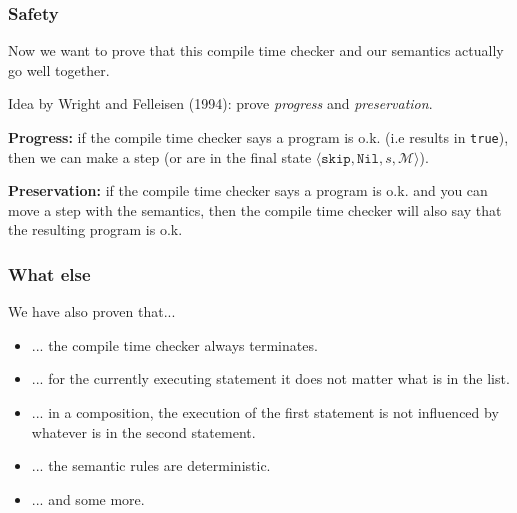\documentclass{beamer}
\newcommand{\sk}[0]{\texttt{skip}}
\newcommand{\nil}[0]{\texttt{Nil}}
\newcommand{\tr}[0]{\texttt{true}}
\newcommand{\sosb}[4]{\langle #1, #2, #3, \mathcal{#4} \rangle}
\begin{document}
\begin{frame}
\frametitle{Safety}
Now we want to prove that this compile time checker and our semantics actually go well together.

Idea by Wright and Felleisen (1994): prove \emph{progress} and \emph{preservation}.

\vspace{0.7cm}
\textbf{Progress:} if the compile time checker says a program is o.k. (i.e results in \tr), then we can make a step (or are in the final state $\sosb{\sk}{\nil}{s}{M}$).

\vspace{0.2cm}
\textbf{Preservation:} if the compile time checker says a program is o.k. and you can move a step with the semantics, then the compile time checker will also say that the resulting program is o.k.
\end{frame}


\begin{frame}
\frametitle{What else}
We have also proven that...
\begin{itemize}
    \item ... the compile time checker always terminates.
    \item ... for the currently executing statement it does not matter what is in the list.
    \item ... in a composition, the execution of the first statement is not influenced by whatever is in the second statement.
    \item ... the semantic rules are deterministic.
    \item ... and some more.
\end{itemize}
\end{frame}
\end{document}
